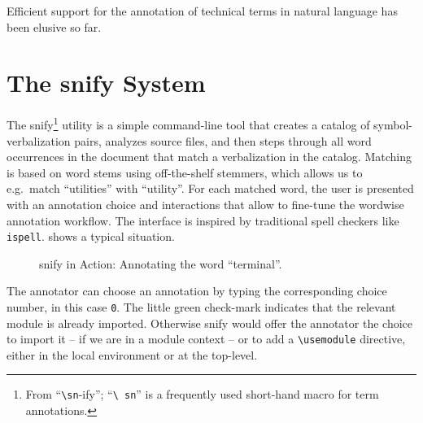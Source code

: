 \documentclass[runningheads]{llncs}
\newcommand\snify{\textsf{snify}\xspace}
\begin{document}
Efficient support for the annotation of technical terms in natural language
has been elusive so far.


\section{The \snify System}\label{sec:snify}

The \snify\footnote{ From ``\texttt{\textbackslash sn}-ify''; ``\texttt{\textbackslash
    sn}'' is a frequently used \sTeX short-hand macro for term annotations.}  utility
\cite{stextools:git} is a simple command-line tool that creates a catalog of
symbol-verbalization pairs, analyzes \sTeX source files, and then steps through all word
occurrences in the document that match a verbalization in the catalog.  Matching is based
on word stems using off-the-shelf stemmers, which allows us to e.g.\ match ``utilities''
with ``utility''.  For each matched word, the user is presented with an annotation choice
and interactions that allow to fine-tune the wordwise annotation workflow.  The interface
is inspired by traditional spell checkers like \lstinline|ispell|.   shows
a typical situation.

\begin{figure}[ht]
  \setlength{\fboxsep}{0pt}
  \caption{\snify in Action: Annotating the word ``terminal''.}\label{fig:snify}
\end{figure}

The annotator can choose an annotation by typing the corresponding choice number,
in this case \lstinline|0|.
The little green check-mark indicates that the relevant module is already imported.
Otherwise \snify would offer the annotator the choice to import it -- if we are
in a module context -- or to add a \lstinline|\usemodule| directive, either in the
local environment or at the top-level.
\end{document}
